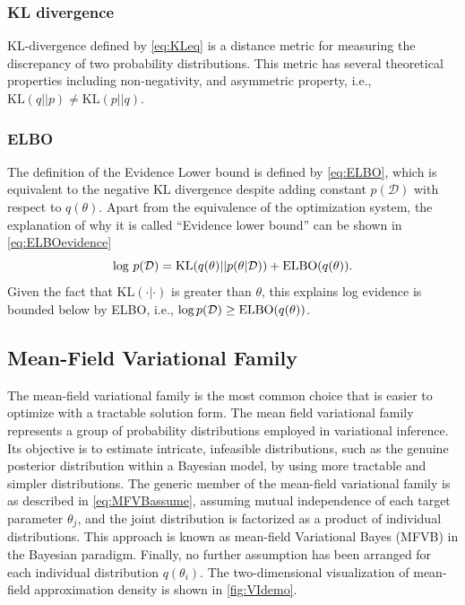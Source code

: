 \subsubsection{KL divergence}
KL-divergence defined by \autoref{eq:KLeq} is a distance metric for measuring the discrepancy of two probability distributions. This metric has several theoretical properties including non-negativity, and asymmetric property, i.e., $\mbox{KL}(q||p)\ne \mbox{KL}(p||q)$.

\subsubsection{ELBO}
The definition of the Evidence Lower bound is defined by \autoref{eq:ELBO}, which is equivalent to the negative KL divergence despite adding constant $p(\mathcal{D})$ with respect to $q(\theta)$. 
Apart from the equivalence of the optimization system, the explanation of why it is called ``Evidence lower bound'' can be shown in \autoref{eq:ELBOevidence}
\begin{equation}
	\label{eq:ELBOevidence}
	\textnormal{log}\ p(\mathcal{D}) = \text{KL}(q(\theta)||p(\theta|\mathcal{D})) + \text{ELBO}(q(\theta)).
\end{equation}
Given the fact that KL$(\cdot|\cdot)$ is greater than $\theta$, this explains log evidence is bounded below by ELBO, i.e., $\textnormal{log}\, p(\mathcal{D}) \geq \text{ELBO}(q(\theta))$.

\subsection{Mean-Field Variational Family} 
The mean-field variational family is the most common choice that is easier to optimize with a tractable solution form.
The mean field variational family represents a group of probability distributions employed in variational inference. Its objective is to estimate intricate, infeasible distributions, such as the genuine posterior distribution within a Bayesian model, by using more tractable and simpler distributions. 
The generic member of the mean-field variational family is as described in \autoref{eq:MFVBassume}, assuming mutual independence of each target parameter $\theta_j$, and the joint distribution is factorized as a product of individual distributions. This approach is known as mean-field Variational Bayes (MFVB) in the Bayesian paradigm. Finally, no further assumption has been arranged for each individual distribution $q(\theta_i)$.
The two-dimensional visualization of mean-field approximation density is shown in \autoref{fig:VIdemo}.

